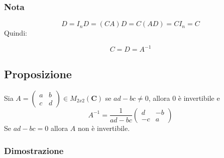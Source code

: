 \documentclass[12pt]{article}
\begin{document}
\subsubsection{Nota}

\[D = I_nD = (CA)D = C(AD) = CI_n = C\]
Quindi:

\[C = D = A^{-1}\]

\subsection{Proposizione}

Sia $A = \begin{pmatrix}
    a & b\\
    c & d
\end{pmatrix} \in M_{2x2} (\mathbf{C})$ se $ad - bc \neq 0$, allora 0 è invertibile  e
\[
A^{-1} = \frac{1}{ad-bc}\begin{pmatrix}
    d & -b\\
    -c & a
\end{pmatrix}
\]
Se $ad-bc = 0$ allora $A$ non è invertibile.

\subsubsection{Dimostrazione}
\end{document}
